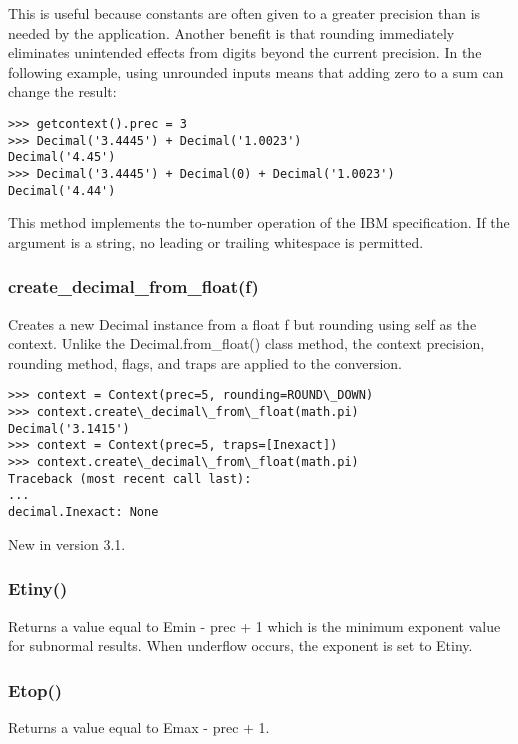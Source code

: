 This is useful because constants are often given to a greater precision than is needed by the application. Another benefit is that rounding immediately eliminates unintended effects from digits beyond the current precision. In the following example, using unrounded inputs means that adding zero to a sum can change the result:

\begin{lstlisting}
>>> getcontext().prec = 3
>>> Decimal('3.4445') + Decimal('1.0023')
Decimal('4.45')
>>> Decimal('3.4445') + Decimal(0) + Decimal('1.0023')
Decimal('4.44')
\end{lstlisting}

This method implements the to-number operation of the IBM specification. If the argument is a string, no leading or trailing whitespace is permitted.

\subsubsection{create\_decimal\_from\_float(f)}

Creates a new Decimal instance from a float f but rounding using self as the context. Unlike the Decimal.from\_float() class method, the context precision, rounding method, flags, and traps are applied to the conversion.

\begin{lstlisting}
>>> context = Context(prec=5, rounding=ROUND\_DOWN)
>>> context.create\_decimal\_from\_float(math.pi)
Decimal('3.1415')
>>> context = Context(prec=5, traps=[Inexact])
>>> context.create\_decimal\_from\_float(math.pi)
Traceback (most recent call last):
...
decimal.Inexact: None
\end{lstlisting}


New in version 3.1.

\subsubsection{Etiny()}

Returns a value equal to Emin - prec + 1 which is the minimum exponent value for subnormal results. When underflow occurs, the exponent is set to Etiny.

\subsubsection{Etop()}

Returns a value equal to Emax - prec + 1.

